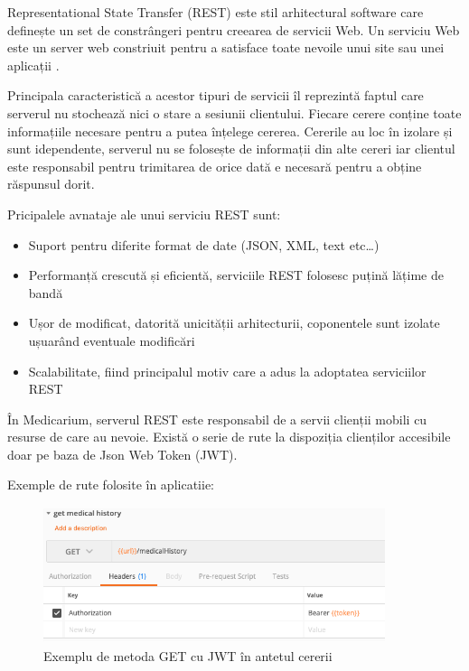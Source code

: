 \documentclass[12pt]{article}
\begin{document}
Representational State Transfer (REST) este stil arhitectural software care definește
un set de constrângeri pentru creearea de servicii Web. Un serviciu Web este un server web
constriuit pentru a satisface toate nevoile unui site sau unei aplicații \cite{masse2011rest}.

Principala caracteristică a acestor tipuri de servicii îl reprezintă faptul care serverul
nu stochează nici o stare a sesiunii clientului. Fiecare cerere conține toate informațiile
necesare pentru a putea înțelege cererea. Cererile au loc în izolare și sunt idependente, serverul
nu se folosește de informații din alte cereri iar clientul este responsabil pentru trimitarea de
orice dată e necesară pentru a obține răspunsul dorit.

Pricipalele avnataje ale unui serviciu REST sunt:

\begin{itemize}
    \item Suport pentru diferite format de date (JSON, XML, text etc\dots)
    \item Performanță crescută și eficientă, serviciile REST folosesc puțină lățime de bandă
    \item Ușor de modificat, datorită unicității arhitecturii, coponentele sunt izolate
    ușuarând eventuale modificări
    \item Scalabilitate, fiind principalul motiv care a adus la adoptatea serviciilor REST \cite{masse2011rest}
\end{itemize}

În Medicarium, serverul REST este responsabil de a servii clienții mobili cu resurse de
care au nevoie. Există o serie de rute la dispoziția clienților accesibile doar pe baza 
de Json Web Token (JWT). 

\bigskip

Exemple de rute folosite în aplicatiie:

\begin{figure}[H]
\centering
\includegraphics[width=10cm, height=4cm]{get.png}
\caption{Exemplu de metoda GET cu JWT în antetul cererii}
\end{figure}
\end{document}
